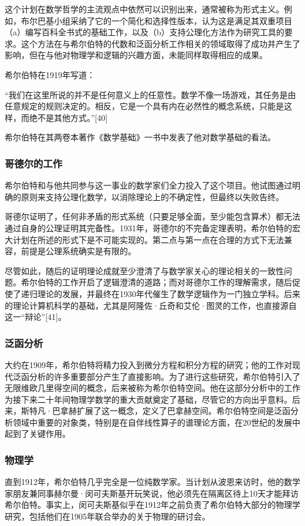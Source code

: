这个计划在数学哲学的主流观点中依然可以识别出来，通常被称为形式主义。例如，布尔巴基小组采纳了它的一个简化和选择性版本，认为这是满足其双重项目（a）编写百科全书式的基础工作，以及（b）支持公理化方法作为研究工具的要求。这个方法在与希尔伯特的代数和泛函分析工作相关的领域取得了成功并产生了影响，但在与他对物理学和逻辑的兴趣方面，未能同样取得相应的成果。

希尔伯特在1919年写道：

“我们在这里所说的并不是任何意义上的任意性。数学不像一场游戏，其任务是由任意规定的规则决定的。相反，它是一个具有内在必然性的概念系统，只能是这样，而绝不是其他方式。”[40]

希尔伯特在其两卷本著作《数学基础》一书中发表了他对数学基础的看法。
\subsubsection{哥德尔的工作}
希尔伯特和与他共同参与这一事业的数学家们全力投入了这个项目。他试图通过明确的原则来支持公理化数学，以消除理论上的不确定性，但最终以失败告终。

哥德尔证明了，任何非矛盾的形式系统（只要足够全面，至少能包含算术）都无法通过自身的公理证明其完备性。1931年，哥德尔的不完备定理表明，希尔伯特的宏大计划在所述的形式下是不可能实现的。第二点与第一点在合理的方式下无法兼容，前提是公理系统确实是有限的。

尽管如此，随后的证明理论成就至少澄清了与数学家关心的理论相关的一致性问题。希尔伯特的工作开启了逻辑澄清的道路；而对哥德尔工作的理解需求，随后促使了递归理论的发展，并最终在1930年代催生了数学逻辑作为一门独立学科。后来的理论计算机科学的基础，尤其是阿隆佐·丘奇和艾伦·图灵的工作，也直接源自这一“辩论”[41]。
\subsubsection{泛函分析}
大约在1909年，希尔伯特将精力投入到微分方程和积分方程的研究；他的工作对现代泛函分析的许多重要部分产生了直接影响。为了进行这些研究，希尔伯特引入了无限维欧几里得空间的概念，后来被称为希尔伯特空间。他在这部分分析中的工作为接下来二十年间物理学数学的重大贡献奠定了基础，尽管它的方向出乎意料。后来，斯特凡·巴拿赫扩展了这一概念，定义了巴拿赫空间。希尔伯特空间是泛函分析领域中重要的对象类，特别是在自伴线性算子的谱理论方面，在20世纪的发展中起到了关键作用。
\subsubsection{物理学}
直到1912年，希尔伯特几乎完全是一位纯数学家。当计划从波恩来访时，他的数学家朋友兼同事赫尔曼·闵可夫斯基开玩笑说，他必须先在隔离区待上10天才能拜访希尔伯特。事实上，闵可夫斯基似乎在1912年之前负责了希尔伯特大部分的物理学研究，包括他们在1905年联合举办的关于物理的研讨会。

